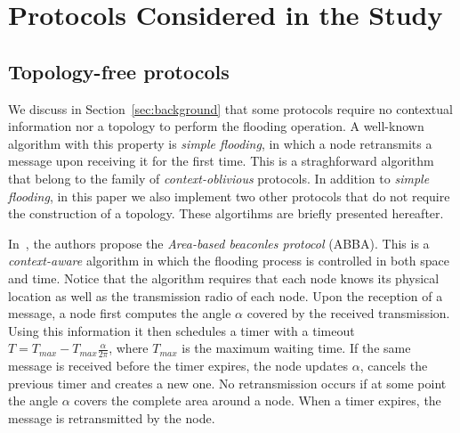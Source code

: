 
\section{Protocols Considered in the Study}
\label{sec:protocols}


\subsection*{Topology-free protocols}
We discuss in Section~\ref{sec:background} that some protocols require no contextual information nor a topology to perform the flooding operation.
A well-known algorithm with this property is \textit{simple flooding}, in which a node retransmits a message upon receiving it for the first time.
This is a straghforward algorithm that belong to the family of \textit{context-oblivious} protocols.
In addition to \textit{simple flooding}, in this paper we also implement two other protocols that do not require the construction of a topology.
These algortihms are briefly presented hereafter.

In~\cite{Ovalle-Martinez2006}, the authors propose the \textit{Area-based beaconles protocol} (ABBA).
This is a \textit{context-aware} algorithm in which the flooding process is controlled in both space and time.
Notice that the algorithm requires that each node knows its physical location as well as the transmission radio of each node.
Upon the reception of a message, a node first computes the angle $\alpha$ covered by the received transmission.
Using this information it then schedules a timer with a timeout $T = T_\textit{max} - T_\textit{max}\frac{\alpha}{2\pi}$, where $T_\textit{max}$ is the maximum waiting time.
If the same message is received before the timer expires, the node updates $\alpha$, cancels the previous timer and creates a new one.
No retransmission occurs if at some point the angle $\alpha$ covers the complete area around a node.
When a timer expires, the message is retransmitted by the node.

